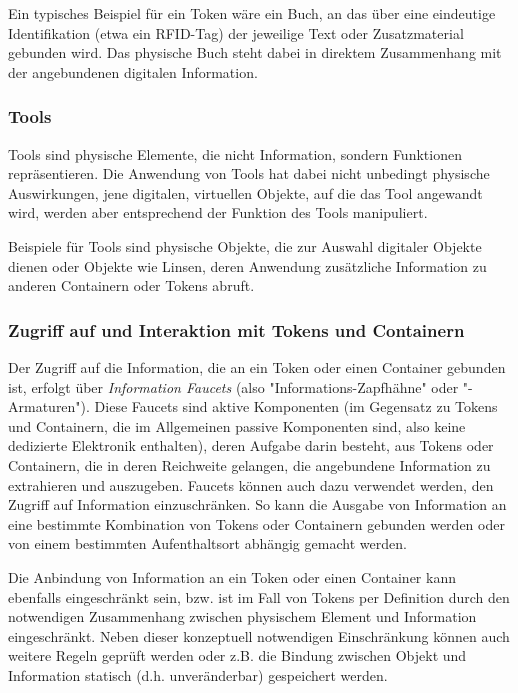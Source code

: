 Ein typisches Beispiel für ein Token wäre ein Buch, an das über eine eindeutige Identifikation (etwa ein \gls{RFID}-Tag) der jeweilige Text oder Zusatzmaterial gebunden wird. Das physische Buch steht dabei in direktem Zusammenhang mit der angebundenen digitalen Information.

\subsubsection{Tools}
Tools sind physische Elemente, die nicht Information, sondern Funktionen repräsentieren. Die Anwendung von Tools hat dabei nicht unbedingt physische Auswirkungen, jene digitalen, virtuellen Objekte, auf die das Tool angewandt wird, werden aber entsprechend der Funktion des Tools manipuliert.

Beispiele für Tools sind physische Objekte, die zur Auswahl digitaler Objekte dienen oder Objekte wie Linsen, deren Anwendung zusätzliche Information zu anderen Containern oder Tokens abruft.

\subsubsection{Zugriff auf und Interaktion mit Tokens und Containern}

Der Zugriff auf die Information, die an ein Token oder einen Container gebunden ist, erfolgt über \emph{Information Faucets} (also "Informations-Zapfhähne" oder "-Armaturen"). Diese Faucets sind aktive Komponenten (im Gegensatz zu Tokens und Containern, die im Allgemeinen passive Komponenten sind, also keine dedizierte Elektronik enthalten), deren Aufgabe darin besteht, aus Tokens oder Containern, die in deren Reichweite gelangen, die angebundene Information zu extrahieren und auszugeben. Faucets können auch dazu verwendet werden, den Zugriff auf Information einzuschränken. So kann die Ausgabe von Information an eine bestimmte Kombination von Tokens oder Containern gebunden werden oder von einem bestimmten Aufenthaltsort abhängig gemacht werden.

Die Anbindung von Information an ein Token oder einen Container kann ebenfalls eingeschränkt sein, bzw. ist im Fall von Tokens per Definition durch den notwendigen Zusammenhang zwischen physischem Element und Information eingeschränkt. Neben dieser konzeptuell notwendigen Einschränkung können auch weitere Regeln geprüft werden oder z.B. die Bindung zwischen Objekt und Information statisch (d.h. unveränderbar) gespeichert werden. 

